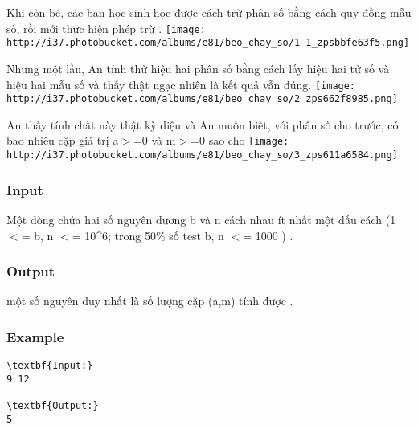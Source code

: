 



    Khi còn bé, các bạn học sinh học được cách trừ phân số bằng cách quy đồng mẫu số, rồi mới thực hiện phép trừ      .   
\texttt{[image: http://i37.photobucket.com/albums/e81/beo\_chay\_so/1-1\_zpsbbfe63f5.png]}

    Nhưng một lần, An tính thử hiệu hai phân số bằng cách lấy hiệu hai tử số và hiệu hai mẫu số và thấy thật ngạc nhiên là kết quả vẫn đúng.    
\texttt{[image: http://i37.photobucket.com/albums/e81/beo\_chay\_so/2\_zps662f8985.png]}

     An thấy tính chất này thật kỳ diệu và An muốn biết, với phân số         cho trước, có bao nhiêu cặp giá trị         a$>$=0 và m$>$=0         sao cho     
\texttt{[image: http://i37.photobucket.com/albums/e81/beo\_chay\_so/3\_zps611a6584.png]}

\subsubsection{   Input  }

    Một dòng chứa hai số nguyên dương b       và n       cách nhau ít nhất một dấu cách (1 $<$= b, n $<$= 10\textasciicircum6; trong 50\% số test b, n $<$= 1000       )      .  

\subsubsection{   Output  }

    một số nguyên duy nhất là số lượng cặp (a,m)       tính được      .  

\subsubsection{   Example  }
\begin{verbatim}
\textbf{Input:}
9 12

\textbf{Output:}
5
\end{verbatim}